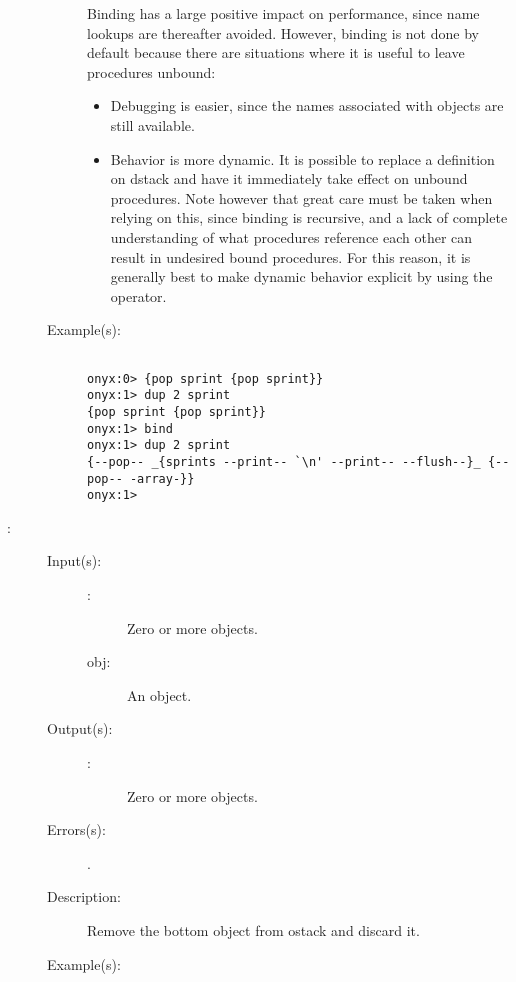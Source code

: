 \begin{description}
\begin{description}
		Binding has a large positive impact on performance, since name
		lookups are thereafter avoided.  However, binding is not done by
		default because there are situations where it is useful to leave
		procedures unbound:
		\begin{itemize}
		\item{Debugging is easier, since the names associated with
		objects are still available.}
		\item{Behavior is more dynamic.  It is possible to replace a
		definition on dstack and have it immediately take effect on
		unbound procedures.  Note however that great care must be taken
		when relying on this, since binding is recursive, and a lack of
		complete understanding of what procedures reference each other
		can result in undesired bound procedures.  For this reason, it
		is generally best to make dynamic behavior explicit by using the
		 operator.}
		\end{itemize}
	\item[Example(s): ]\begin{verbatim}

onyx:0> {pop sprint {pop sprint}}
onyx:1> dup 2 sprint
{pop sprint {pop sprint}}
onyx:1> bind
onyx:1> dup 2 sprint
{--pop-- _{sprints --print-- `\n' --print-- --flush--}_ {--pop-- -array-}}
onyx:1>
		\end{verbatim}
	\end{description}
\label{systemdict:bpop}
\item[{\onyxop{obj \commas}{bpop}{\commas}}: ]
	\begin{description}\item[]
	\item[Input(s): ]
		\begin{description}\item[]
		\item[\commas: ]
			Zero or more objects.
		\item[obj: ]
			An object.
		\end{description}
	\item[Output(s): ]
		\begin{description}\item[]
		\item[\commas: ]
			Zero or more objects.
		\end{description}
	\item[Errors(s): ]
		\begin{description}\item[]
		\item[.]
		\end{description}
	\item[Description: ]
		Remove the bottom object from ostack and discard it.
	\item[Example(s): ]\begin{verbatim}


\end{verbatim}
\end{description}
\end{description}
